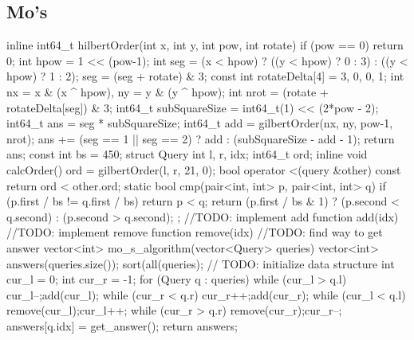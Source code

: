 \documentclass[10pt, landscape, twocolumn, a4paper, notitlepage]{article}
\begin{document}
\subsection{Mo's}
\begin{code}
inline int64_t hilbertOrder(int x, int y, int pow, int rotate) {
    if (pow == 0) return 0;
    int hpow = 1 << (pow-1);
    int seg = (x < hpow) 
            ? ((y < hpow) ? 0 : 3) 
            : ((y < hpow) ? 1 : 2);
    seg = (seg + rotate) & 3;
    const int rotateDelta[4] = {3, 0, 0, 1};
    int nx = x & (x ^ hpow), ny = y & (y ^ hpow);
    int nrot = (rotate + rotateDelta[seg]) & 3;
    int64_t subSquareSize = int64_t(1) << (2*pow - 2);
    int64_t ans = seg * subSquareSize;
    int64_t add = gilbertOrder(nx, ny, pow-1, nrot);
    ans += (seg == 1 || seg == 2) ? add : (subSquareSize - add - 1);
    return ans;
}
const int bs = 450;
struct Query {
    int l, r, idx;
    int64_t ord;
    inline void calcOrder() {
        ord = gilbertOrder(l, r, 21, 0);
    }
    bool operator <(query &other) const {
        return ord < other.ord;
    }
    static bool cmp(pair<int, int> p, pair<int, int> q) {
        if (p.first / bs != q.first / bs)
            return p < q;
        return (p.first / bs & 1) ? (p.second < q.second) : (p.second > q.second);
    }
};
//TODO: implement add function add(idx)
//TODO: implement remove function remove(idx)
//TODO: find way to get answer
vector<int> mo_s_algorithm(vector<Query> queries) {
    vector<int> answers(queries.size());
    sort(all(queries);
    // TODO: initialize data structure
    int cur_l = 0;
    int cur_r = -1;
    for (Query q : queries) {
        while (cur_l > q.l) {
            cur_l--;add(cur_l);
        }
        while (cur_r < q.r) {
            cur_r++;add(cur_r);
        }
        while (cur_l < q.l) {
            remove(cur_l);cur_l++;
        }
        while (cur_r > q.r) {
            remove(cur_r);cur_r--;
        }
        answers[q.idx] = get_answer();
    }
    return answers;
}
\end{code}
\end{document}
